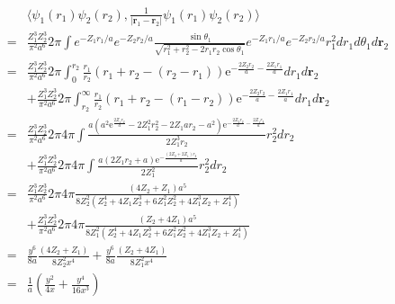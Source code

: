 \begin{align*}
    &\langle
    \psi_1(r_1)\psi_2(r_2),
    \frac{1}{|\bm r_1-\bm r_2|}
    \psi_1(r_1)\psi_2(r_2)
    \rangle\\=&
    \frac{Z_1^3Z_2^3}{\pi^2a^6}
    2\pi
    \int
    e^{-Z_1r_1/a}
    e^{-Z_2r_2/a}
    \frac{\sin\theta_1}{\sqrt{r_1^2+r_2^2-2r_1r_2\cos\theta_1}}
    e^{-Z_1r_1/a}
    e^{-Z_2r_2/a}
    r_1^2 dr_1d\theta_1 d\bm r_2\\
    =&
    \frac{Z_1^3Z_2^3}{\pi^2a^6}
    2\pi
    \int_0^{r_2}
    \frac{r_1}{r_2} 
    (r_1+r_2 - (r_2-r_1)) \mathrm{e}^{-\frac{2Z_{2} r_{2}}{a} - \frac{2Z_{1} r_{1}}{a}}
    dr_1d\bm r_2\\
    &+
    \frac{Z_1^3Z_2^3}{\pi^2a^6}
    2\pi
    \int_{r_2}^\infty
    \frac{r_1}{r_2}(r_1+r_2 - (r_1-r_2)) \mathrm{e}^{-\frac{2Z_{2} r_{2}}{a} - \frac{2Z_{1} r_{1}}{a}}
    dr_1d\bm r_2\\
    =&
    \frac{Z_1^3Z_2^3}{\pi^2a^6}
    2\pi 4\pi
    \int \frac{a \left(a^{2} \mathrm{e}^{\frac{2Z_{1} r_{2}}{a}} - 2Z_{1}^{2} r_{2}^{2} - 2Z_{1} ar_{2} - a^{2}\right) \mathrm{e}^{-\frac{2Z_{2} r_{2}}{a} - \frac{2Z_{1} r_{2}}{a}}}{2Z_{1}^{3} r_{2}} r_2^2dr_2
    \\&+
    \frac{Z_1^3Z_2^3}{\pi^2a^6}
    2\pi4\pi 
    \int 
    \frac{a \left(2Z_{1} r_{2} + a\right) \mathrm{e}^{-\frac{\left(2Z_{2} + 2Z_{1}\right) r_{2}}{a}}}{2Z_{1}^{2}}
    r_2^2dr_2\\
    =&
    \frac{Z_1^3Z_2^3}{\pi^2a^6}
    2\pi 4\pi
    \frac{\left(4Z_{2} + Z_{1}\right) a^{5}}{8Z_{2}^{2} \left(Z_{2}^{4} + 4Z_{1} Z_{2}^{3} + 6Z_{1}^{2} Z_{2}^{2} + 4Z_{1}^{3} Z_{2} + Z_{1}^{4}\right)}\\
    &+
    \frac{Z_1^3Z_2^3}{\pi^2a^6}
    2\pi 4\pi
    \frac{\left(Z_{2} + 4Z_{1}\right) a^{5}}{8Z_{1}^{2} \left(Z_{2}^{4} + 4Z_{1} Z_{2}^{3} + 6Z_{1}^{2} Z_{2}^{2} + 4Z_{1}^{3} Z_{2} + Z_{1}^{4}\right)}\\
    =&
    \frac{y^6}{8a}\frac{(4Z_2+Z_1)}{8Z_2^2x^4}
    +
    \frac{y^6}{8a}\frac{(Z_2+4Z_1)}{8Z_1^2x^4}\\
    =&
    \frac{1}{a}
    (\frac{y^2}{4x}+\frac{y^4}{16x^3})
\end{align*}
